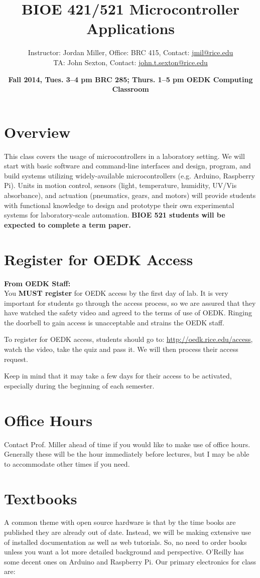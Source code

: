 \documentclass[10pt]{article}
\title{\textbf{BIOE 421/521 Microcontroller Applications}}
\date{\textbf{Fall 2014, Tues. 3--4 pm BRC 285; Thurs. 1--5 pm OEDK Computing Classroom}}                                           %
\author{Instructor: Jordan Miller, Office: BRC 415, Contact: \href{mailto:jmil@rice.edu}{jmil@rice.edu} \\ TA: John Sexton, Contact: \href{mailto:john.t.sexton@rice.edu}{john.t.sexton@rice.edu}}
\begin{document}
\maketitle

\section*{Overview}
This class covers the usage of microcontrollers in a laboratory setting. We will start with basic software and command-line interfaces and design, program, and build systems utilizing widely-available microcontrollers (e.g. Arduino, Raspberry Pi). Units in motion control, sensors (light, temperature, humidity, UV/Vis absorbance), and actuation (pneumatics, gears, and motors) will provide students with functional knowledge to design and prototype their own experimental systems for laboratory-scale automation. \textbf{BIOE 521 students will be expected to complete a term paper.}

\section*{Register for OEDK Access}
\textbf{From OEDK Staff:}\\
You \textbf{MUST register} for OEDK access by the first day of lab. It is very important for students go through the access process, so we are assured that they have watched the safety video and agreed to the terms of use of OEDK. Ringing the doorbell to gain access is unacceptable and strains the OEDK staff.  

To register for OEDK access, students should go to: \href{http://oedk.rice.edu/access}{http://oedk.rice.edu/access}, watch the video, take the quiz and pass it. We will then process their access request.

Keep in mind that it may take a few days for their access to be activated, especially during the beginning of each semester.

\section*{Office Hours}
Contact Prof. Miller ahead of time if you would like to make use of office hours. Generally these will be the hour immediately before lectures, but I may be able to accommodate other times if you need.

\section*{Textbooks}
A common theme with open source hardware is that by the time books are published they are already out of date. Instead, we will be making extensive use of installed documentation as well as web tutorials. So, no need to order books unless you want a lot more detailed background and perspective. O'Reilly has some decent ones on Arduino and Raspberry Pi. Our primary electronics for class are:
\end{document}
